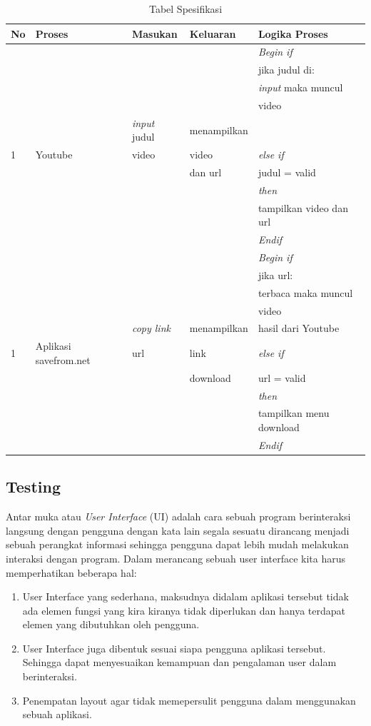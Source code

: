 \begin{table}[!htbp]
\centering
\caption{Tabel Spesifikasi}
\label{tableSpec1}
\begin{tabular}{|l|l|l|l|l|}
\hline
No & Proses & Masukan & Keluaran & Logika Proses \\
\hline

 & & & & \textit{Begin if}\\
 & & & & jika judul di: \\
 & & & & \textit{input} maka muncul  \\
 & & & & video \\
 & & \textit{input} judul& menampilkan \\
1 &  Youtube & video & video & \textit{else if} \\
 & & & dan url& judul = valid \\
 & & & & \textit{then} \\
 & & & & tampilkan video dan url \\
 & & & & \textit{Endif} \\
\hline

 & & & & \textit{Begin if}\\
 & & & & jika url: \\
 & & & & terbaca maka muncul  \\
 & & & & video \\
 & & \textit{copy link} & menampilkan  & hasil dari Youtube \\
1 &  Aplikasi savefrom.net &url& link & \textit{else if} \\
 & & & download& url = valid \\
 & & & & \textit{then} \\
 & & & & tampilkan menu download \\
 & & & & \textit{Endif} \\
\hline

\end{tabular}
\end{table}

\subsection{Testing}
Antar muka atau \textit{User Interface} (UI) adalah cara sebuah program berinteraksi langsung dengan pengguna dengan kata lain segala sesuatu dirancang menjadi sebuah perangkat informasi sehingga pengguna dapat lebih mudah melakukan interaksi dengan program. Dalam merancang sebuah user interface kita harus memperhatikan beberapa hal:
\begin{enumerate}
    \item User Interface yang sederhana, maksudnya didalam aplikasi tersebut tidak ada elemen fungsi yang kira kiranya tidak diperlukan dan hanya terdapat elemen yang dibutuhkan oleh pengguna.
    \item User Interface juga dibentuk sesuai siapa pengguna aplikasi tersebut. Sehingga dapat menyesuaikan kemampuan dan pengalaman user dalam berinteraksi.
    \item Penempatan layout agar tidak memepersulit pengguna dalam menggunakan sebuah aplikasi.
 
\end{enumerate} 
